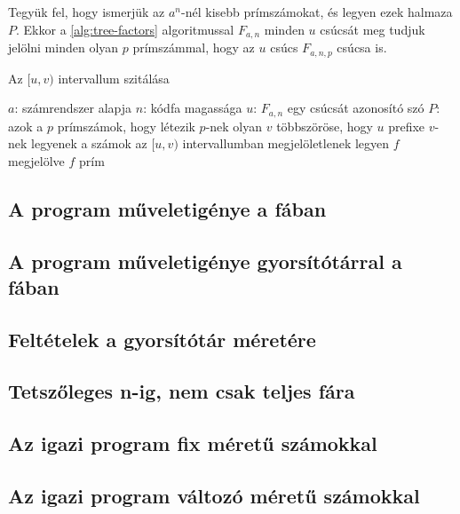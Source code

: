 \documentclass[12pt]{report}
\begin{document}
Tegyük fel, hogy ismerjük az $a^n$-nél kisebb prímszámokat, és legyen ezek halmaza $P$.
Ekkor a \ref{alg:tree-factors} algoritmussal $F_{a,n}$ minden $u$ csúcsát meg tudjuk jelölni minden olyan $p$ prímszámmal, hogy az $u$ csúcs $F_{a,n,p}$ csúcsa is.

\begin{algorithm}
\caption{Az $[u, v)$ intervallum szitálása}
\label{alg:tree-factors}
\begin{algorithmic}[1]
\Require $a$: számrendszer alapja
\Require $n$: kódfa magassága
\Require $u$: $F_{a,n}$ egy csúcsát azonosító szó
\Require $P$: azok a $p$ prímszámok, hogy létezik $p$-nek olyan $v$ többszöröse, hogy $u$ prefixe $v$-nek
	\State legyenek a számok az $[u, v)$ intervallumban megjelöletlenek
			\State legyen $f$ megjelölve
		\EndFor
	\EndFor
	\For{$f \in [u, v)$}
			\State $f$ prím
		\EndIf
	\EndFor
\EndProcedure
\end{algorithmic}
\end{algorithm}

\subsection{A program műveletigénye a fában}

\subsection{A program műveletigénye gyorsítótárral a fában}

\subsection{Feltételek a gyorsítótár méretére}

\subsection{Tetszőleges n-ig, nem csak teljes fára}

\subsection{Az igazi program fix méretű számokkal}

\subsection{Az igazi program változó méretű számokkal}
\end{document}
